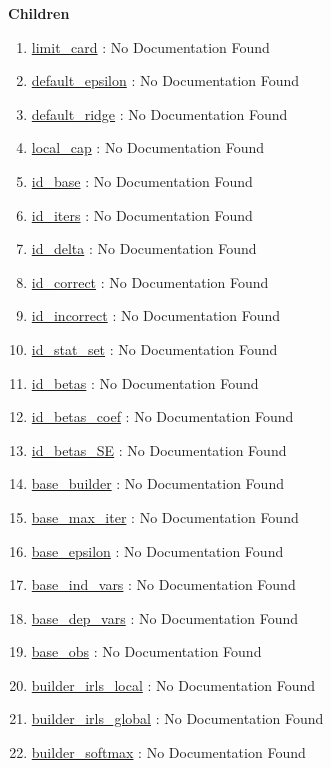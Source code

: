 \textbf{Children}
\begin{enumerate}
\item \hyperlink{ecldoc:constants.limit_card}{limit\_card}
: No Documentation Found
\item \hyperlink{ecldoc:constants.default_epsilon}{default\_epsilon}
: No Documentation Found
\item \hyperlink{ecldoc:constants.default_ridge}{default\_ridge}
: No Documentation Found
\item \hyperlink{ecldoc:constants.local_cap}{local\_cap}
: No Documentation Found
\item \hyperlink{ecldoc:constants.id_base}{id\_base}
: No Documentation Found
\item \hyperlink{ecldoc:constants.id_iters}{id\_iters}
: No Documentation Found
\item \hyperlink{ecldoc:constants.id_delta}{id\_delta}
: No Documentation Found
\item \hyperlink{ecldoc:constants.id_correct}{id\_correct}
: No Documentation Found
\item \hyperlink{ecldoc:constants.id_incorrect}{id\_incorrect}
: No Documentation Found
\item \hyperlink{ecldoc:constants.id_stat_set}{id\_stat\_set}
: No Documentation Found
\item \hyperlink{ecldoc:constants.id_betas}{id\_betas}
: No Documentation Found
\item \hyperlink{ecldoc:constants.id_betas_coef}{id\_betas\_coef}
: No Documentation Found
\item \hyperlink{ecldoc:constants.id_betas_se}{id\_betas\_SE}
: No Documentation Found
\item \hyperlink{ecldoc:constants.base_builder}{base\_builder}
: No Documentation Found
\item \hyperlink{ecldoc:constants.base_max_iter}{base\_max\_iter}
: No Documentation Found
\item \hyperlink{ecldoc:constants.base_epsilon}{base\_epsilon}
: No Documentation Found
\item \hyperlink{ecldoc:constants.base_ind_vars}{base\_ind\_vars}
: No Documentation Found
\item \hyperlink{ecldoc:constants.base_dep_vars}{base\_dep\_vars}
: No Documentation Found
\item \hyperlink{ecldoc:constants.base_obs}{base\_obs}
: No Documentation Found
\item \hyperlink{ecldoc:constants.builder_irls_local}{builder\_irls\_local}
: No Documentation Found
\item \hyperlink{ecldoc:constants.builder_irls_global}{builder\_irls\_global}
: No Documentation Found
\item \hyperlink{ecldoc:constants.builder_softmax}{builder\_softmax}
: No Documentation Found
\end{enumerate}

